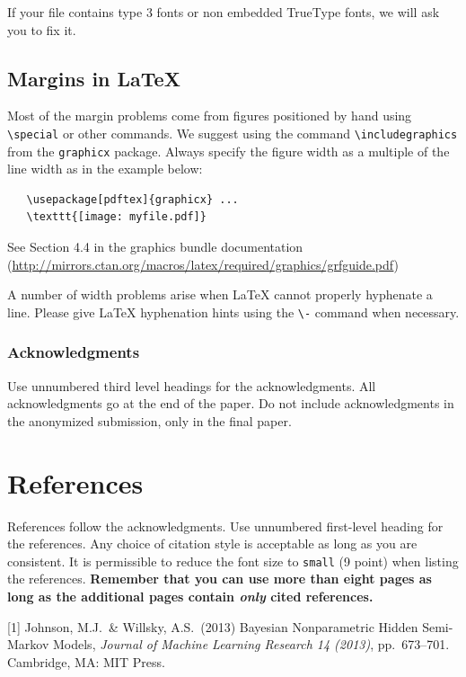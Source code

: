 \documentclass{article}
\begin{document}
If your file contains type 3 fonts or non embedded TrueType fonts, we will ask
you to fix it.

\subsection{Margins in \LaTeX{}}

Most of the margin problems come from figures positioned by hand using
\verb+\special+ or other commands. We suggest using the command
\verb+\includegraphics+ from the \verb+graphicx+ package. Always specify the
figure width as a multiple of the line width as in the example below:
\begin{verbatim}
   \usepackage[pdftex]{graphicx} ...
   \texttt{[image: myfile.pdf]}
\end{verbatim}
See Section 4.4 in the graphics bundle documentation
(\url{http://mirrors.ctan.org/macros/latex/required/graphics/grfguide.pdf})

A number of width problems arise when \LaTeX{} cannot properly hyphenate a
line. Please give LaTeX hyphenation hints using the \verb+\-+ command when
necessary.

\subsubsection*{Acknowledgments}

Use unnumbered third level headings for the acknowledgments. All acknowledgments
go at the end of the paper. Do not include acknowledgments in the anonymized
submission, only in the final paper.

\section*{References}

References follow the acknowledgments. Use unnumbered first-level heading for
the references. Any choice of citation style is acceptable as long as you are
consistent. It is permissible to reduce the font size to \verb+small+ (9 point)
when listing the references. {\bf Remember that you can use more than eight
  pages as long as the additional pages contain \emph{only} cited references.}
\medskip

\small

[1] Johnson, M.J.\ \& Willsky, A.S.\ (2013) Bayesian Nonparametric Hidden Semi-Markov Models, {\it Journal of Machine Learning Research 14 (2013)},
pp.\ 673--701. Cambridge, MA: MIT Press.
\end{document}

